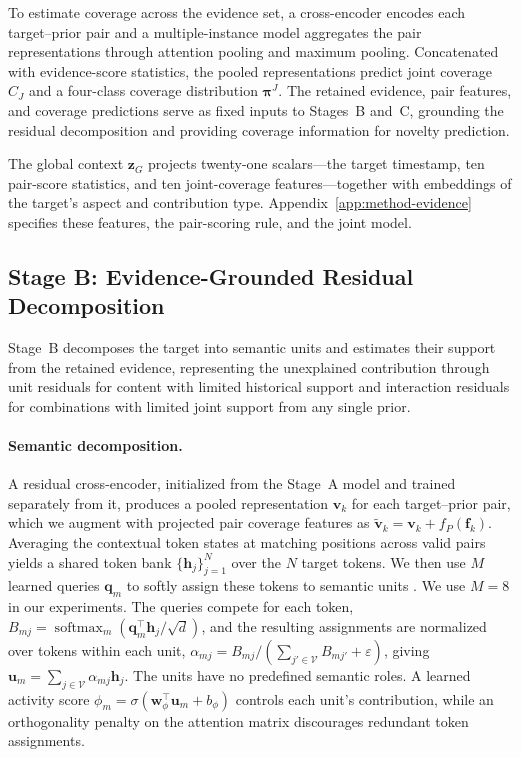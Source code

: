 To estimate coverage across the evidence set, a cross-encoder
\citep{nogueira2019rerank} encodes each
target--prior pair and a multiple-instance model
\citep{ilse2018attentionmil} aggregates the pair representations through
attention pooling and maximum pooling. Concatenated with evidence-score
statistics, the pooled representations predict joint coverage $C_J$ and a
four-class coverage distribution $\boldsymbol{\pi}^{J}$.
The retained evidence, pair features, and coverage predictions
serve as fixed inputs to Stages~B and~C, grounding the residual decomposition
and providing coverage information for novelty prediction.

The global context $\boldsymbol{z}_G$ projects twenty-one scalars---the target
timestamp, ten pair-score statistics, and ten joint-coverage features---together
with embeddings of the target's aspect and contribution type.
Appendix~\ref{app:method-evidence} specifies these features, the pair-scoring
rule, and the joint model.

\subsection{Stage B: Evidence-Grounded Residual Decomposition}
\label{sec:method-decomposition}

Stage~B decomposes the target into semantic units and estimates their support
from the retained evidence, representing the unexplained contribution through
unit residuals for content with limited historical support and interaction
residuals for combinations with limited joint support from any single prior.

\paragraph{Semantic decomposition.}
A residual cross-encoder, initialized from the Stage~A model and trained
separately from it, produces a pooled representation $\boldsymbol{v}_k$ for
each target--prior pair, which we augment with projected pair coverage
features as $\widetilde{\boldsymbol{v}}_k=\boldsymbol{v}_k+f_P(\boldsymbol{f}_k)$.
Averaging the contextual token states at matching positions across valid pairs
yields a shared token bank $\{\boldsymbol{h}_j\}_{j=1}^{N}$ over the $N$ target
tokens. We then use $M$ learned queries $\boldsymbol{q}_m$ to softly assign
these tokens to semantic units \citep{carion2020detr,locatello2020slot}.
We use $M=8$ in our experiments. The queries compete for each token,
$B_{mj}=\operatorname{softmax}_{m}(\boldsymbol{q}_m^\top\boldsymbol{h}_j/\sqrt d)$,
and the resulting assignments are normalized over tokens within each unit,
$\alpha_{mj}=B_{mj}/(\sum_{j'\in\mathcal{V}}B_{mj'}+\varepsilon)$, giving
$\boldsymbol{u}_m=\sum_{j\in\mathcal{V}}\alpha_{mj}\boldsymbol{h}_j$. The units
have no predefined semantic roles. A learned activity score
$\phi_m=\sigma(\boldsymbol{w}_\phi^\top\boldsymbol{u}_m+b_\phi)$ controls each unit's
contribution, while an orthogonality penalty on the attention matrix
discourages redundant token assignments.

